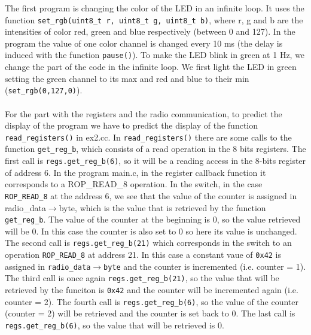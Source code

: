 \documentclass[11pt]{article}
\begin{document}
The first program is changing the color of the LED in an infinite loop. It uses the function \texttt{set\_rgb(uint8\_t r, uint8\_t g, uint8\_t b)}, where r, g and b are the intensities of color red, green and blue respectively (between 0 and 127). In the program the value of one color channel is changed every 10 ms (the delay is induced with the function \texttt{pause()}). %
To make the LED blink in green at 1 Hz, we change the part of the code in the infinite loop. We first light the LED in green setting the green channel to its max and red and blue to their min (\texttt{set\_rgb(0,127,0)}). %
\\
\\
For the part with the registers and the radio communication, to predict the display of the program we have to predict the display of the function \texttt{read\_registers()} in ex2.cc. In \texttt{read\_registers()} there are some calls to the function \texttt{get\_reg\_b}, which consists of a read operation in the 8 bits registers. The first call is \texttt{regs.get\_reg\_b(6)}, so it will be a reading access in the 8-bits register of address 6. In the program main.c, in the register callback function it corresponds to a ROP\_READ\_8 operation. In the switch, in the case \texttt{ROP\_READ\_8} at the address 6, we see that the value of the counter is assigned in radio\_data${\rightarrow}$byte, which is the value that is retrieved by the function \texttt{get\_reg\_b}. The value of the counter at the beginning is 0, so the value retrieved will be 0. In this case the counter is also set to 0 so here its value is unchanged. The second call is \texttt{regs.get\_reg\_b(21)} which corresponds in the switch to an operation \texttt{ROP\_READ\_8} at address 21. In this case a constant vaue of \texttt{0x42} is assigned in \texttt{radio\_data}${\rightarrow}$\texttt{byte} and the counter is incremented (i.e. counter = 1). The third call is once again \texttt{regs.get\_reg\_b(21)}, so the value that will be retrieved by the funciton is \texttt{0x42} and the counter will be incremented again (i.e. counter = 2). The fourth call is \texttt{regs.get\_reg\_b(6)}, so the value of the counter (counter = 2) will be retrieved and the counter is set back to 0. The last call is \texttt{regs.get\_reg\_b(6)}, so the value that will be retrieved is 0.
\end{document}
